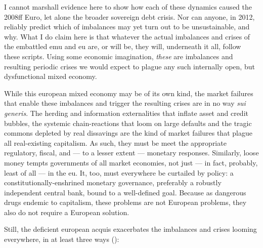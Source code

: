 I cannot marshall evidence here to show how each of these dynamics caused the 2008ff Euro, let alone the broader sovereign debt crisis.
Nor can anyone, in 2012, reliably predict which of imbalances may yet turn out to be unsustainable, and why.
What I do claim here is that whatever the actual imbalances and crises of the embattled \gls{emu} and \gls{eu} are, or will be, they will, underneath it all, follow these scripts.
Using some economic imagination, \emph{these} are imbalances and resulting periodic crises we would expect to plague any such internally open, but dysfunctional mixed economy.

While this european mixed economy may be of its own kind, the market failures that enable these imbalances and trigger the resulting crises are in no way \emph{sui generis}.
The herding and information externalities that inflate asset and credit bubbles, the systemic chain-reactions that loom on large defaults and the tragic commons depleted by real dissavings are the kind of market failures that plague all real-existing capitalism.
As such, they must be meet the appropriate regulatory, fiscal, and --- to a lesser extent --- monetary responses.
Similarly, loose money tempts governments of all market economies, not just --- in fact, probably, least of all --- in the \gls{eu}.
It, too, must everywhere be curtailed by policy:
a constitutionally-enshrined monetary governance, preferably a robustly independent central bank, bound to a well-defined goal.
Because as dangerous drugs endemic to capitalism, these problems are not European problems, they also do not require a European solution.

Still, the deficient european acquis exacerbates the imbalances and crises looming everywhere, in at least three ways (\citep[echoed by][25]{Bordo2011}):


